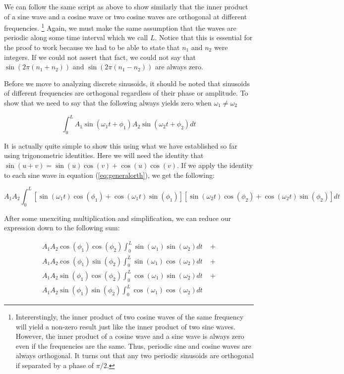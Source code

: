 	We can follow the same script as above to show similarly that the inner product of a sine wave and a cosine wave
	or two cosine waves are orthogonal at different frequencies. \footnote{Intererstingly, the inner product of two cosine
	waves of the same frequency will yield a non-zero result just like the inner product of two sine waves.  However, the 
	inner product of a cosine wave and a sine wave is always zero even if the frequencies are the same.  Thus, periodic 
	sine and cosine waves are always orthogonal.  It turns out that any two periodic sinusoids are orthogonal if separated
	by a phase of $\pi/2$.}  Again,
	we must make the same assumption that the waves are periodic along some time interval which we call $L$.  Notice
	that this is essential for the proof to work because we had to be able to state that $n_1$ and $n_2$ were integers.
	If we could not assert that fact, we could not say that $\sin(2\pi(n_1 + n_2))$
	and $\sin(2\pi(n_1 - n_2))$ are always zero.
	
	Before we move to analyzing discrete sinusoids, it should be noted that sinusoids of different frequencies are 
	orthogonal regardless of their phase or amplitude.  To show that we need to say that the following always yields
	zero when $\omega_1 \neq \omega_2$
	
	\begin{equation}
	\label{eq:generalorth}
	\int_{0}^{L}A_1\sin(\omega_1 t + \phi_1)A_2\sin(\omega_2 t + \phi_2)dt
	\end{equation}
	
	It is actually quite simple to show this using what we have established so far using trigonometric identities.  Here
	we will need the identity that $\sin(u + v) = \sin(u)\cos(v) + \cos(u)\cos(v)$.  If we apply the identity to each 
	sine wave in equation (\ref{eq:generalorth}), we get the following:
	
	$$ 
	A_1A_2\int_{0}^{L}\left[\sin(\omega_1 t)\cos(\phi_1) + \cos(\omega_1t)\sin(\phi_1)\right]
	\left[\sin(\omega_2 t)\cos(\phi_2) + \cos(\omega_2t)\sin(\phi_2)\right]dt
	$$	
	
	After some unexciting multiplication and simplification, we can reduce our expression down to the following sum:
	
	\begin{equation}
	\begin{split}
		A_1A_2\cos(\phi_1)\cos(\phi_2)\int_{0}^{L}\sin(\omega_1)\sin(\omega_2)dt \; &+ \\
A_1A_2\cos(\phi_1)\sin(\phi_2)\int_{0}^{L}\sin(\omega_1)\cos(\omega_2)dt \; &+ \\
A_1A_2\sin(\phi_1)\cos(\phi_2)\int_{0}^{L}\cos(\omega_1)\sin(\omega_2)dt \; &+ \\
A_1A_2\sin(\phi_1)\sin(\phi_2)\int_{0}^{L}\cos(\omega_1)\cos(\omega_2)dt
	\end{split}
	\end{equation}


